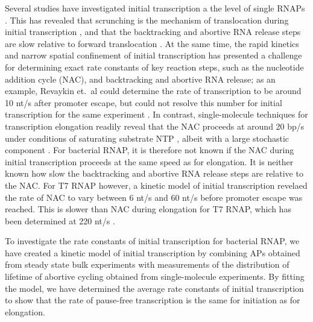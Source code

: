 Several studies have investigated initial transcription a the level of single
RNAPs \cite{kapanidis_retention_2005, margeat_direct_2006,
revyakin_abortive_2006, tang_real-time_2009, kapanidis_initial_2006}. This has
revealed that scrunching is the mechanism of translocation during initial
transcription \cite{revyakin_abortive_2006, kapanidis_initial_2006}, and that
the backtracking and abortive RNA release steps are slow relative to forward
translocation \cite{margeat_direct_2006, revyakin_abortive_2006}. At the same
time, the rapid kinetics and narrow spatial confinement of initial
transcription has presented a challenge for determining exact rate constants
of key reaction steps, such as the nucleotide addition cycle (NAC), and
backtracking and abortive RNA release; as an example, Revaykin et.\ al could
determine the rate of transcription to be around 10 nt/s after promoter
escape, but could not resolve this number for initial transcription for the
same experiment \cite{revyakin_abortive_2006}. In contrast, single-molecule
techniques for transcription elongation readily reveal that the NAC proceeds
at around 20 bp/s under conditions of saturating substrate NTP
\cite{bai_mechanochemical_2007, mejia_trigger_2014}, albeit with a large
stochastic component \cite{tolic-norrelykke_diversity_2004}. For bacterial
RNAP, it is therefore not known if the NAC during initial transcription
proceeds at the same speed as for elongation. It is neither known how slow the
backtracking and abortive RNA release steps are relative to the NAC. For T7
RNAP however, a kinetic model of initial transcription revelaed the rate of
NAC to vary between 6 nt/s and 60 nt/s before promoter escape was reached. This
is slower than NAC during elongation for T7 RNAP, which has been determined at
220 nt/s \cite{anand_transient_2006}.

To investigate the rate constants of initial transcription for bacterial RNAP,
we have created a kinetic model of initial transcription by combining APs
obtained from steady state bulk experiments with measurements of the
distribution of lifetime of abortive cycling obtained from single-molecule
experiments. By fitting the model, we have determined the average rate
constants of initial transcription to show that the rate of pause-free
transcription is the same for initiation as for elongation.
